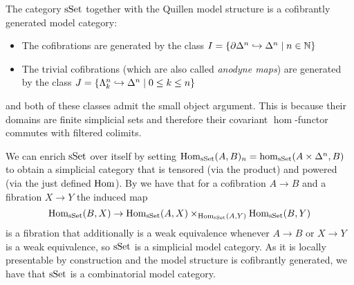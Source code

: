 \begin{remark}
    The category $\operatorname{sSet}$ together with the Quillen model structure is a cofibrantly generated model category:
    \begin{itemize}
        \item The cofibrations are generated by the class $I=\left\lbrace\partial\Delta^n\hookrightarrow \Delta^n\mid n\in\mathbb{N}\right\rbrace$
        \item The trivial cofibrations (which are also called \emph{anodyne maps}) are generated by the class $J=\left\lbrace\Lambda_k^n\hookrightarrow\Delta^n\mid 0\leq k\leq n\right\rbrace$
    \end{itemize}
    and both of these classes admit the small object argument.
    This is because their domains are finite simplicial sets and therefore their covariant $\hom$-functor commutes with filtered colimits.

    We can enrich $\operatorname{sSet}$ over itself by setting $\operatorname{Hom}_{\operatorname{sSet}}(A,B)_n=\hom_{\operatorname{sSet}}(A\times\Delta^n,B)$ to obtain a simplicial category that is tensored (via the product) and powered (via the just defined $\operatorname{Hom}$).
    By %
    we have that for a cofibration $A\to B$ and a fibration $X\to Y$ the induced map 
    \begin{equation*}
        \operatorname{Hom}_{\operatorname{sSet}}(B,X)\to\operatorname{Hom}_{\operatorname{sSet}}(A,X)\times_{\operatorname{Hom}_{\operatorname{sSet}}(A,Y)}\operatorname{Hom}_{\operatorname{sSet}}(B,Y)
    \end{equation*}
    is a fibration that additionally is a weak equivalence whenever $A\to B$ or $X\to Y$ is a weak equivalence, so $\operatorname{sSet}$ is a simplicial model category.
    As it is locally presentable by construction and the model structure is cofibrantly generated, we have that $\operatorname{sSet}$ is a combinatorial model category.
\end{remark}

